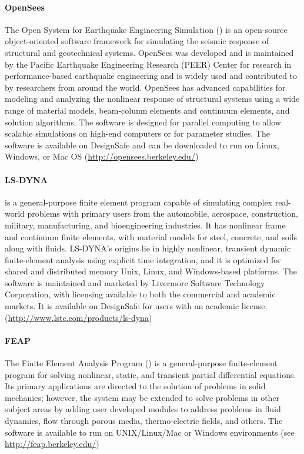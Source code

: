 \paragraph{OpenSees} The Open System for Earthquake Engineering Simulation () is an open-source object-oriented software framework for simulating the seismic response of structural and geotechnical systems. OpenSees was developed and is maintained by the Pacific Earthquake Engineering Research (PEER) Center for research in performance-based earthquake engineering and is widely used and contributed to by researchers from around the world. OpenSees has advanced capabilities for modeling and analyzing the nonlinear response of structural systems using a wide range of material models, beam-column elements and continuum elements, and solution algorithms. The software is designed for parallel computing to allow scalable simulations on high-end computers or for parameter studies. The software is available on DesignSafe and can be downloaded to run on Linux, Windows, or Mac OS (\url{http://opensees.berkeley.edu/})

\paragraph{LS-DYNA}  is a general-purpose finite element program capable of simulating complex real-world problems with primary users from the automobile, aerospace, construction, military, manufacturing, and bioengineering industries. It has nonlinear frame and continuum finite elements, with material models for steel, concrete, and soils along with fluids. LS-DYNA's origins lie in highly nonlinear, transient dynamic finite-element analysis using explicit time integration, and it is optimized for shared and distributed memory Unix, Linux, and Windows-based platforms. The software is maintained and marketed by Livermore Software Technology Corporation, with licensing available to both the commercial and academic markets. It is available on DesignSafe for users with an academic license. (\url{http://www.lstc.com/products/ls-dyna}) 

\paragraph{FEAP} The Finite Element Analysis Program () is a general-purpose finite-element program for solving nonlinear, static, and transient partial differential equations. Its primary applications are directed to the solution of problems in solid mechanics; however, the system may be extended to solve problems in other subject areas by adding user developed modules to address problems in fluid dynamics, flow through porous media, thermo-electric fields, and others. The software is available to run on UNIX/Linux/Mac or Windows environments (see \url{http://feap.berkeley.edu/})

